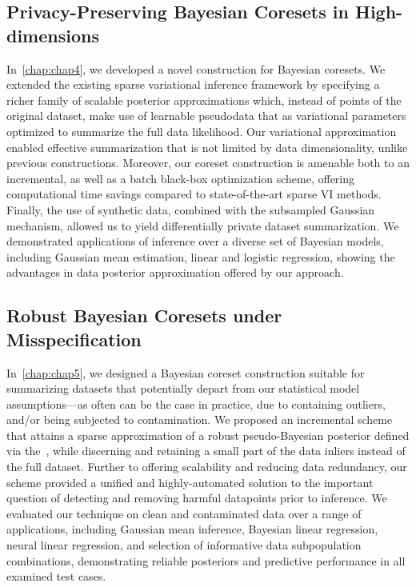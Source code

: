 \subsection{Privacy-Preserving Bayesian Coresets in High-dimensions}
\label{subsec:ch4-summary}
In~\cref{chap:chap4}, we developed a novel construction for Bayesian coresets. We extended the existing sparse variational inference framework by specifying a richer family of scalable posterior approximations which, instead of points of the original dataset, make use of learnable pseudodata that as variational parameters optimized to summarize the full data likelihood. Our variational approximation enabled effective summarization that is not limited by data dimensionality, unlike previous constructions. Moreover, our coreset construction is amenable both to an incremental, as well as a batch black-box optimization scheme, offering computational time savings compared to state-of-the-art sparse VI methods. Finally, the use of synthetic data, combined with the subsampled Gaussian mechanism, allowed us to yield differentially private dataset summarization. We demonstrated applications of inference over a diverse set of Bayesian models, including Gaussian mean estimation, linear and logistic regression, showing the advantages in data posterior approximation offered by our approach.

\subsection{Robust Bayesian Coresets under Misspecification}
\label{subsec:ch4-summary}
In~\cref{chap:chap5}, we designed a Bayesian coreset construction suitable for summarizing datasets that potentially depart from our statistical model assumptions---as often can be the case in practice, due to containing outliers, and/or being subjected to contamination. We proposed an incremental scheme that attains a sparse approximation of a robust pseudo-Bayesian posterior defined via the~\bdiv, while discerning and retaining a small part of the data inliers instead of the full dataset. Further to offering scalability and reducing data redundancy, our scheme provided a unified and highly-automated solution to the important question of detecting and removing harmful datapoints prior to inference. We evaluated our technique on clean and contaminated data over a range of applications, including Gaussian mean inference, Bayesian linear regression, neural linear regression, and selection of informative data subpopulation combinations, demonstrating reliable posteriors and predictive performance in all examined test cases.


